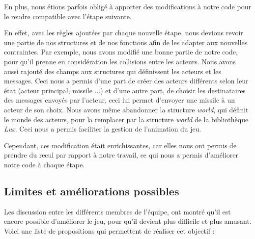 \documentclass[a4paper,10pt]{article}
\begin{document}
En plus, nous étions parfois obligé à apporter des modifications à notre code pour le rendre compatible avec l'étape suivante.
\newline

En effet, avec les règles ajoutées par chaque nouvelle étape, nous devions revoir une partie de nos structures et de nos fonctions afin de les adapter aux nouvelles contraintes. Par exemple, nous avons modifié une bonne partie de notre code, pour qu'il prenne en considération les collisions entre les acteurs. Nous avons aussi rajouté des champs aux structures qui définissent les acteurs et les messages. Ceci nous a permis d'une part de créer des acteurs différents selon leur état (acteur principal, missile ...) et d'une autre part, de choisir les destinataires des messages envoyés par l'acteur, ceci lui permet d'envoyer une missile à un acteur de son choix. Nous avons même abandonner la structure \textit{world}, qui définit le monde des acteurs, pour la remplacer par la structure \textit{world} de la bibliothèque \textit{Lux}. Ceci nous a permis faciliter la gestion de l'animation du jeu.
\newline


Cependant, ces modification était enrichissantes, car elles nous ont permis de prendre du recul par rapport à notre travail, ce qui nous a permis d'améliorer notre code à chaque étape.


\subsection{Limites et améliorations possibles}

Les discussion entre les différents membres de l'équipe, ont montré qu'il est encore possible d'améliorer le jeu, pour qu'il devient plus difficile et plus amusant. Voici une liste de propositions qui permettent de réaliser cet objectif :\\
\end{document}
